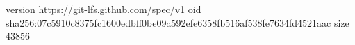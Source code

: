 version https://git-lfs.github.com/spec/v1
oid sha256:07c5910c8375fc1600edbff0be09a592efe6358fb516af538fe7634fd4521aac
size 43856
